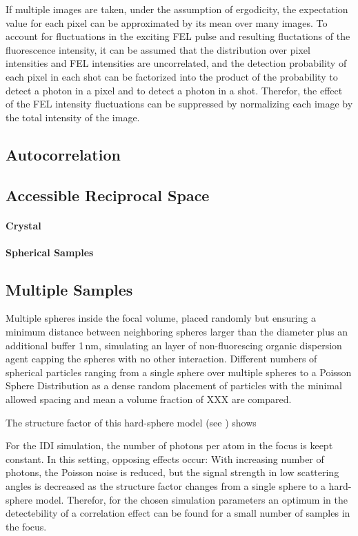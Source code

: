 If multiple images are taken, under the assumption of ergodicity, the expectation value for each pixel can be approximated by its mean over many images. To account for fluctuations in the exciting FEL pulse and resulting fluctations of the fluorescence intensity, it can be assumed that the distribution over pixel  intensities and FEL intensities are uncorrelated, and the detection probability of each pixel in each shot can be factorized into the product of the probability to detect a photon in a pixel and to detect a photon in a shot. Therefor, the effect of the FEL intensity fluctuations can be suppressed by normalizing each image by the total intensity of the image.



\subsection{Autocorrelation}

\subsection{Accessible Reciprocal Space}
	\paragraph{Crystal}
	\paragraph{Spherical Samples}

\subsection{Multiple Samples}
Multiple spheres inside the focal volume, placed randomly but ensuring a minimum distance between neighboring spheres larger than the diameter plus an additional buffer 1\,nm, simulating an layer of non-fluorescing organic dispersion agent capping the spheres with no other interaction. 
Different numbers of spherical particles ranging from a single sphere over multiple spheres to a Poisson Sphere Distribution as a dense random placement of particles with the minimal allowed spacing and mean a volume fraction of XXX are compared.

The structure factor of this hard-sphere model  (see ) shows

For the IDI simulation, the number of photons per atom in the focus is keept constant. In this setting, opposing effects occur: With increasing number of photons, the Poisson noise is reduced, but the signal strength in low scattering angles is decreased as the structure factor changes from a single sphere to a hard-sphere model. Therefor, for the chosen simulation parameters an optimum in the detectebility of a correlation effect can be found for a small number of samples in the focus.



